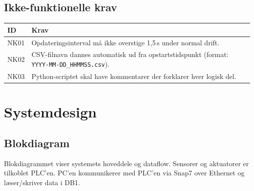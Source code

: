 \documentclass[12pt, a4paper]{article}
\begin{document}
\vspace{0.4cm}
\subsection{Ikke-funktionelle krav}

\begin{tabularx}{\textwidth}{lX}
\toprule
\textbf{ID} & \textbf{Krav} \\
\midrule
NK01 & Opdateringsinterval må ikke overstige 1{,}5\,s under normal drift. \\[4pt]
NK02 & CSV-filnavn dannes automatisk ud fra opstartstidspunkt (format: \texttt{YYYY-MM-DD\_HHMMSS.csv}). \\[4pt]
NK03 & Python-scriptet skal have kommentarer der forklarer hver logisk del. \\
\bottomrule
\end{tabularx}

\section{Systemdesign}

\subsection{Blokdiagram}

Blokdiagrammet viser systemets hoveddele og dataflow.
Sensorer og aktuatorer er tilkoblet PLC'en.
PC'en kommunikerer med PLC'en via Snap7 over Ethernet og læser/skriver
data i DB1.
\end{document}
